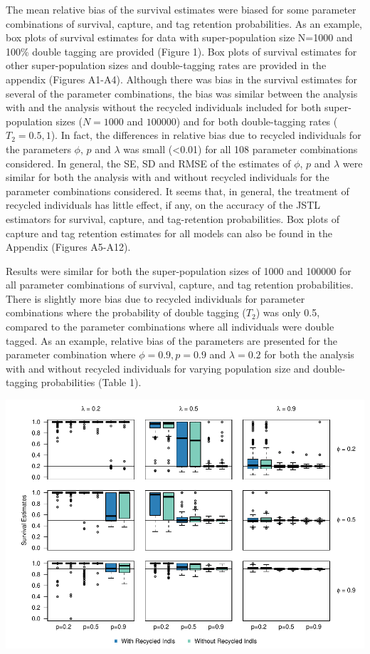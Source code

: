 \documentclass[]{article}
\begin{document}
The mean relative bias of the survival estimates were biased for some
parameter combinations of survival, capture, and tag retention
probabilities. As an example, box plots of survival estimates for data
with super-population size N=1000 and 100\% double tagging are provided
(Figure 1). Box plots of survival estimates for other super-population
sizes and double-tagging rates are provided in the appendix (Figures
A1-A4). Although there was bias in the survival estimates for several of
the parameter combinations, the bias was similar between the analysis
with and the analysis without the recycled individuals included for both
super-population sizes (\(N=1000\) and \(100 000\)) and for both
double-tagging rates (\(T_2=0.5,1\)). In fact, the differences in
relative bias due to recycled individuals for the parameters \(\phi\),
\(p\) and \(\lambda\) was small (\textless{}0.01) for all 108 parameter
combinations considered. In general, the SE, SD and RMSE of the
estimates of \(\phi\), \(p\) and \(\lambda\) were similar for both the
analysis with and without recycled individuals for the parameter
combinations considered. It seems that, in general, the treatment of
recycled individuals has little effect, if any, on the accuracy of the
JSTL estimators for survival, capture, and tag-retention probabilities.
Box plots of capture and tag retention estimates for all models can also
be found in the Appendix (Figures A5-A12).

Results were similar for both the super-population sizes of 1000 and
100000 for all parameter combinations of survival, capture, and tag
retention probabilities. There is slightly more bias due to recycled
individuals for parameter combinations where the probability of double
tagging (\(T_2\)) was only 0.5, compared to the parameter combinations
where all individuals were double tagged. As an example, relative bias of
the parameters are presented for the parameter combination where
\(\phi=0.9, p=0.9\) and \(\lambda=0.2\) for both the analysis with and
without recycled individuals for varying population size and
double-tagging probabilities (Table 1).

\includegraphics{RecycledPaper_files/figure-latex/Figure1_survival_GJSTL1-1.pdf}
\end{document}
